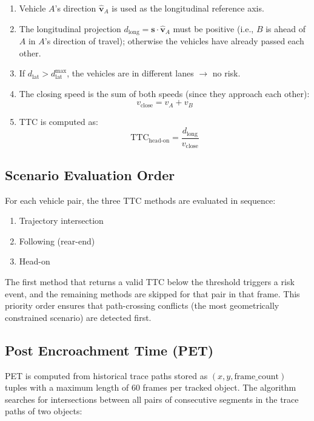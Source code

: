 \documentclass[12pt]{report}
\begin{document}
\begin{enumerate}
    \item Vehicle $A$'s direction $\hat{\mathbf{v}}_A$ is used as the longitudinal reference axis.
    \item The longitudinal projection $d_\text{long} = \mathbf{s} \cdot \hat{\mathbf{v}}_A$ must be positive (i.e., $B$ is ahead of $A$ in $A$'s direction of travel); otherwise the vehicles have already passed each other.
    \item If $d_\text{lat} > d_\text{lat}^\text{max}$, the vehicles are in different lanes $\to$ no risk.
    \item The closing speed is the sum of both speeds (since they approach each other):
    \begin{equation}
        v_\text{close} = v_A + v_B
        \label{eq:closing_speed_headon}
    \end{equation}
    \item TTC is computed as:
    \begin{equation}
        \text{TTC}_\text{head-on} = \frac{d_\text{long}}{v_\text{close}}
        \label{eq:ttc_headon}
    \end{equation}
\end{enumerate}

\subsection{Scenario Evaluation Order}

For each vehicle pair, the three TTC methods are evaluated in sequence:
\begin{enumerate}
    \item Trajectory intersection
    \item Following (rear-end)
    \item Head-on
\end{enumerate}
The first method that returns a valid TTC below the threshold triggers a risk event, and the remaining methods are skipped for that pair in that frame.
This priority order ensures that path-crossing conflicts (the most geometrically constrained scenario) are detected first.

\subsection{Post Encroachment Time (PET)}

PET is computed from historical trace paths stored as $(x, y, \text{frame\_count})$ tuples with a maximum length of 60 frames per tracked object.
The algorithm searches for intersections between all pairs of consecutive segments in the trace paths of two objects:
\end{document}
